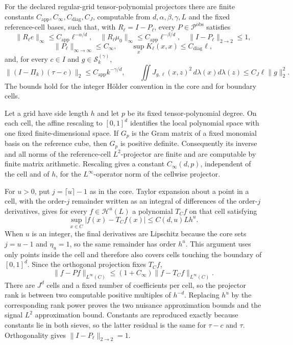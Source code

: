 For the declared regular-grid tensor-polynomial projectors there are finite constants \(C_{\mathrm{app}},C_\infty,C_{\mathrm{diag}},C_J\), computable from \(d,\alpha,\beta,\gamma,L\) and the fixed reference-cell bases, such that, with \(R_\ell=I-P_\ell\), every \(P\in\mathcal P^{\mathrm{obs}}\) satisfies
\[
 \|R_\ell e\|_\infty\le C_{\mathrm{app}}\ell^{-\alpha/d},\quad
 \|R_\ell\mu_0\|_\infty\le C_{\mathrm{app}}\ell^{-\beta/d},\quad
 \|I-P_\ell\|_{2\to2}\le1,
\]
\[
 \|P_\ell\|_{\infty\to\infty}\le C_\infty,\qquad
 \sup_xK_\ell(x,x)\le C_{\mathrm{diag}}\ell,
\]
and, for every \(c\in I\) and \(g\in\mathcal S_k^{(\gamma)}\),
\[
 \|(I-\Pi_k)(\tau-c)\|_2\le C_{\mathrm{app}}k^{-\gamma/d},
 \qquad
 \iint J_{g,\ell}(x,z)^2\,d\lambda(x)d\lambda(z)
 \le C_J\ell\|g\|_2^2.
\]
The bounds hold for the integer Hölder convention in the core and for boundary cells.

Let a grid have side length \(h\) and let \(p\) be its fixed tensor-polynomial degree.  On each cell, the affine rescaling to \([0,1]^d\) identifies the local polynomial space with one fixed finite-dimensional space.  If \(G_p\) is the Gram matrix of a fixed monomial basis on the reference cube, then \(G_p\) is positive definite.  Consequently its inverse and all norms of the reference-cell \(L^2\)-projector are finite and are computable by finite matrix arithmetic.  Rescaling gives a constant \(C_\infty(d,p)\), independent of the cell and of \(h\), for the \(L^\infty\)-operator norm of the cellwise projector.

For \(u>0\), put \(j=\lceil u\rceil-1\) as in the core.  Taylor expansion about a point in a cell, with the order-\(j\) remainder written as an integral of differences of the order-\(j\) derivatives, gives for every \(f\in\mathcal H^u(L)\) a polynomial \(T_Cf\) on that cell satisfying
\[
 \sup_{x\in C}|f(x)-T_Cf(x)|
 \le C(d,u)Lh^u.
\]
When \(u\) is an integer, the final derivatives are Lipschitz because the core sets \(j=u-1\) and \(\eta_u=1\), so the same remainder has order \(h^u\).  This argument uses only points inside the cell and therefore also covers cells touching the boundary of \([0,1]^d\).  Since the orthogonal projection fixes \(T_Cf\),
\[
 \|f-Pf\|_{L^\infty(C)}
 \le(1+C_\infty)\|f-T_Cf\|_{L^\infty(C)}.
\]
There are \(J^d\) cells and a fixed number of coefficients per cell, so the projector rank is between two computable positive multiples of \(h^{-d}\).  Replacing \(h^u\) by the corresponding rank power proves the two nuisance approximation bounds and the signal \(L^2\) approximation bound.  Constants are reproduced exactly because constants lie in both sieves, so the latter residual is the same for \(\tau-c\) and \(\tau\).  Orthogonality gives \(\|I-P_\ell\|_{2\to2}=1\).

